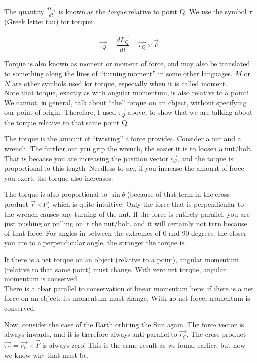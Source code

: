The quantity $\displaystyle \frac{d\vec{L_Q}}{dt}$ is known as the \emph{torque} relative to point Q. We use the symbol $\tau$ (Greek letter tau) for torque:

\begin{equation}
\vec{\tau_Q} = \frac{d\vec{L_Q}}{dt} = \vec{r_Q} \times \vec{F}
\end{equation}

Torque is also known as moment or moment of force, and may also be translated to something along the lines of ``turning moment'' in some other languages. $M$ or $N$ are other symbols used for torque, especially when it is called moment.\\
Note that torque, exactly as with angular momentum, is also relative to a point! We cannot, in general, talk about ``the'' torque on an object, without specifying our point of origin. Therefore, I used $\vec{\tau_Q}$ above, to show that we are talking about the torque relative to that same point Q.

The torque is the amount of ``twisting'' a force provides. Consider a nut and a wrench. The further out you grip the wrench, the easier it is to loosen a nut/bolt. That is because you are increasing the position vector $\vec{r_C}$, and the torque is proportional to this length. Needless to say, if you increase the amount of force you exert, the torque also increases.

The torque is also proportional to $\sin \theta$ (because of that term in the cross product $\vec{r} \times {F}$) which is quite intuitive. Only the force that is perpendicular to the wrench causes any turning of the nut. If the force is entirely parallel, you are just pushing or pulling on it the nut/bolt, and it will certainly not turn because of that force. For angles in between the extremes of 0 and 90 degrees, the closer you are to a perpendicular angle, the stronger the torque is.

If there is a net torque on an object (relative to a point), angular momentum (relative to that same point) must change. With zero net torque, angular momentum is conserved.\\
There is a clear parallel to conservation of linear momentum here: if there is a net force on an object, its momentum must change. With no net force, momentum is conserved.

Now, consider the case of the Earth orbiting the Sun again. The force vector is always inwards, and it is therefore always anti-parallel to $\vec{r_C}$. The cross product $\vec{\tau_C} = \vec{r_C} \times \vec{F}$ is always zero! This is the same result as we found earlier, but now we know why that must be.

